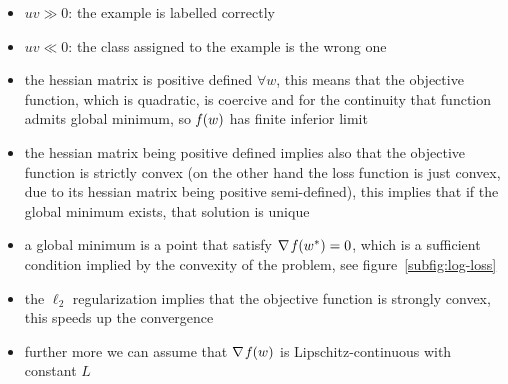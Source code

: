 
\cleardoublepage

\begin{itemize}
\item $uv\gg0$: the example is labelled correctly
\item $uv\ll0$: the class assigned to the example is the wrong one
\end{itemize}

\begin{itemize}
\item the hessian matrix is positive defined $\forall w$, this means that the objective function, which is quadratic, is coercive and for the continuity that function admits global minimum, so $\operatorname*{\mathit{f}}(w)$ has finite inferior limit
\item the hessian matrix being positive defined implies also that the objective function is strictly convex (on the other hand the loss function is just convex, due to its hessian matrix being positive semi-defined), this implies that if the global minimum exists, that solution is unique
\item a global minimum is a point that satisfy $\nabla\operatorname*{\mathit{f}}(w^\ast)=0$, which is a sufficient condition implied by the convexity of the problem, see figure~\vref{subfig:log-loss}
\item the $\ell_2$ regularization implies that the objective function is strongly convex, this speeds up the convergence
\item further more we can assume that $\nabla\operatorname*{\mathit{f}}(w)$ is Lipschitz-continuous with constant $L$
\end{itemize}


\cleardoublepage
